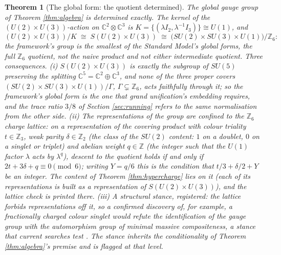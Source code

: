\documentclass[11pt]{article}
\newtheorem{theorem}{Theorem}[section]
\theoremstyle{definition}
\newcommand{\C}{\mathbb{C}}
\begin{document}
\begin{theorem}[The global form: the quotient determined]\label{thm:global}
The global gauge group of Theorem \ref{thm:algebra} is determined exactly. The kernel of the $(U(2) \times U(3))$-action on $\C^{2} \otimes \C^{3}$ is $K = \{(\lambda I_{2}, \lambda^{-1} I_{3})\} \cong U(1)$, and
\begin{equation}\label{eq:global}
(U(2) \times U(3))/K \;\cong\; S(U(2) \times U(3)) \;\cong\; \bigl(SU(2) \times SU(3) \times U(1)\bigr)/\mathbb{Z}_{6}:
\end{equation}
the framework's group is the smallest of the Standard Model's global forms, the full $\mathbb{Z}_{6}$ quotient, not the naive product and not either intermediate quotient. Three consequences. (i) $S(U(2) \times U(3))$ is exactly the subgroup of $SU(5)$ preserving the splitting $\C^{5} = \C^{2} \oplus \C^{3}$, and none of the three proper covers $(SU(2) \times SU(3) \times U(1))/\Gamma$, $\Gamma \subsetneq \mathbb{Z}_{6}$, acts faithfully through it; so the framework's global form is the one that grand unification's embedding requires, and the trace ratio $3/8$ of Section \ref{sec:running} refers to the same normalisation from the other side. (ii) The representations of the group are confined to the $\mathbb{Z}_{6}$ charge lattice: on a representation of the covering product with colour triality $t \in \mathbb{Z}_{3}$, weak parity $\delta \in \mathbb{Z}_{2}$ (the class of the $SU(2)$ content: $1$ on a doublet, $0$ on a singlet or triplet) and abelian weight $q \in \mathbb{Z}$ (the integer such that the $U(1)$ factor $\lambda$ acts by $\lambda^{q}$), descent to the quotient holds if and only if $2t + 3\delta + q \equiv 0 \pmod 6$; writing $Y = q/6$ this is the condition that $t/3 + \delta/2 + Y$ be an integer. The content of Theorem \ref{thm:hypercharge} lies on it (each of its representations is built as a representation of $S(U(2) \times U(3))$), and the lattice check is printed there. (iii) A structural stance, registered: the lattice forbids representations off it, so a confirmed discovery of, for example, a fractionally charged colour singlet would refute the identification of the gauge group with the automorphism group of minimal massive compositeness, a stance that current searches test \cite{PDG2024}. The stance inherits the conditionality of Theorem \ref{thm:algebra}'s premise and is flagged at that level.
\end{theorem}
\end{document}

